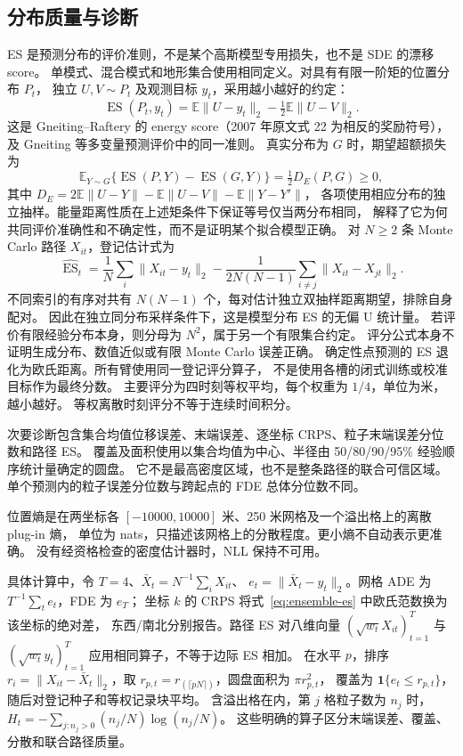 \documentclass[UTF8,11pt]{ctexart}
\newcommand{\ES}{\operatorname{ES}}
\begin{document}
\subsection{分布质量与诊断}
ES 是预测分布的评价准则，不是某个高斯模型专用损失，也不是 SDE 的漂移 score。
单模式、混合模式和地形集合使用相同定义。对具有有限一阶矩的位置分布 \(P_t\)，
独立 \(U,V\sim P_t\) 及观测目标 \(y_t\)，采用越小越好的约定：
\begin{equation}
\ES(P_t,y_t)=\mathbb E\|U-y_t\|_2-\tfrac12\mathbb E\|U-V\|_2.
\label{eq:population-es}
\end{equation}
这是 Gneiting--Raftery 的 energy score（2007 年原文式 22 为相反的奖励符号），
及 Gneiting 等多变量预测评价中的同一准则\cite{gneiting2007,gneiting2008}。
真实分布为 \(G\) 时，期望超额损失为
\begin{equation}
\mathbb E_{Y\sim G}\{\ES(P,Y)-\ES(G,Y)\}=\tfrac12D_E(P,G)\geq0,
\label{eq:es-propriety}
\end{equation}
其中 \(D_E=2\mathbb E\|U-Y\|-\mathbb E\|U-V\|-\mathbb E\|Y-Y'\|\)，
各项使用相应分布的独立抽样。能量距离性质在上述矩条件下保证等号仅当两分布相同，
解释了它为何共同评价准确性和不确定性，而不是证明某个拟合模型正确。
对 \(N\geq2\) 条 Monte Carlo 路径 \(X_{it}\)，登记估计式为
\begin{equation}
\widehat{\ES}_t=\frac1N\sum_i\|X_{it}-y_t\|_2
-\frac{1}{2N(N-1)}\sum_{i\ne j}\|X_{it}-X_{jt}\|_2.
\label{eq:ensemble-es}
\end{equation}
不同索引的有序对共有 \(N(N-1)\) 个，每对估计独立双抽样距离期望，排除自身配对。
因此在独立同分布采样条件下，这是模型分布 ES 的无偏 U 统计量。
若评价有限经验分布本身，则分母为 \(N^2\)，属于另一个有限集合约定。
评分公式本身不证明生成分布、数值近似或有限 Monte Carlo 误差正确。
确定性点预测的 ES 退化为欧氏距离。所有臂使用同一登记评分算子，
不是使用各槽的闭式训练或校准目标作为最终分数。
主要评分为四时刻等权平均，每个权重为 \(1/4\)，单位为米，越小越好。
等权离散时刻评分不等于连续时间积分。

次要诊断包含集合均值位移误差、末端误差、逐坐标 CRPS、粒子末端误差分位数和路径 ES。
覆盖及面积使用以集合均值为中心、半径由 50/80/90/95\% 经验顺序统计量确定的圆盘。
它不是最高密度区域，也不是整条路径的联合可信区域。
单个预测内的粒子误差分位数与跨起点的 FDE 总体分位数不同。

位置熵是在两坐标各 \([-10000,10000]\) 米、250 米网格及一个溢出格上的离散 plug-in 熵，
单位为 nats，只描述该网格上的分散程度。更小熵不自动表示更准确。
没有经资格检查的密度估计器时，NLL 保持不可用。

具体计算中，令 \(T=4\)、\(\bar X_t=N^{-1}\sum_iX_{it}\)、
\(e_t=\|\bar X_t-y_t\|_2\)。网格 ADE 为 \(T^{-1}\sum_t e_t\)，FDE 为 \(e_T\)；
坐标 \(k\) 的 CRPS 将式~\eqref{eq:ensemble-es} 中欧氏范数换为该坐标的绝对差，
东西/南北分别报告。路径 ES 对八维向量
\((\sqrt{w_t}X_{it})_{t=1}^T\) 与 \((\sqrt{w_t}y_t)_{t=1}^T\)
应用相同算子，不等于边际 ES 相加。
在水平 \(p\)，排序 \(r_i=\|X_{it}-\bar X_t\|_2\)，取
\(r_{p,t}=r_{(\lceil pN\rceil)}\)，圆盘面积为 \(\pi r_{p,t}^2\)，
覆盖为 \(\mathbf1\{e_t\leq r_{p,t}\}\)，随后对登记种子和等权记录块平均。
含溢出格在内，第 \(j\) 格粒子数为 \(n_j\) 时，
\(H_t=-\sum_{j:n_j>0}(n_j/N)\log(n_j/N)\)。
这些明确的算子区分末端误差、覆盖、分散和联合路径质量。
\end{document}
